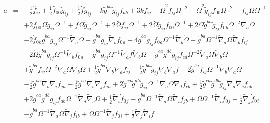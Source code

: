\documentclass[10pt,letterpaper]{article}
\numberwithin{equation}{section}
\begin{document}
\begin{eqnarray}
a&=& - \tfrac{1}{2} \overset{..}{f}_{ij} + \tfrac{1}{2} \overset{..}{f}_{00}{} \tilde{g}_{ij} + \tfrac{1}{2} \overset{..}{f} \tilde{g}_{ij} -  k \tilde{g}^{ba} \tilde{g}_{ij} f_{ab} + 3 k f_{ij} -  \dot{\Omega}^2 f_{ij} \Omega^{-2} -  \dot{\Omega}^2 \tilde{g}_{ij} f_{00}{} \Omega^{-2} -  \dot{f}_{ij} \dot{\Omega} \Omega^{-1} \nonumber \\ 
&& + 2 \dot{f}_{00}{} \dot{\Omega} \tilde{g}_{ij} \Omega^{-1} + \dot{f} \dot{\Omega} \tilde{g}_{ij} \Omega^{-1} + 2 \overset{..}{\Omega} f_{ij} \Omega^{-1} + 2 \overset{..}{\Omega} \tilde{g}_{ij} f_{00}{} \Omega^{-1} + 2 \dot{\Omega} \tilde{g}^{ba} \tilde{g}_{ij} f_{0}{}_{b} \Omega^{-2} \tilde{\nabla}_{a}\Omega \nonumber \\ 
&& - 2 \dot{f}_{0}{}_{b} \tilde{g}^{ba} \tilde{g}_{ij} \Omega^{-1} \tilde{\nabla}_{a}\Omega -  \tilde{g}^{ba} \tilde{g}_{ij} \tilde{\nabla}_{b}\dot{f}_{0}{}_{a} - 4 \tilde{g}^{ba} \tilde{g}_{ij} f_{0}{}_{a} \Omega^{-1} \tilde{\nabla}_{b}\dot{\Omega} + \tilde{g}^{ba} \Omega^{-1} \tilde{\nabla}_{a}\Omega \tilde{\nabla}_{b}f_{ij} \nonumber \\ 
&& - 2 \dot{\Omega} \tilde{g}^{ba} \tilde{g}_{ij} \Omega^{-1} \tilde{\nabla}_{b}f_{0}{}_{a} -  \tilde{g}^{ba} \tilde{g}_{ij} \Omega^{-1} \tilde{\nabla}_{a}f \tilde{\nabla}_{b}\Omega -  \tilde{g}^{ca} \tilde{g}^{db} \tilde{g}_{ij} f_{cd} \Omega^{-2} \tilde{\nabla}_{a}\Omega \tilde{\nabla}_{b}\Omega \nonumber \\ 
&& + \tilde{g}^{ba} f_{ij} \Omega^{-2} \tilde{\nabla}_{a}\Omega \tilde{\nabla}_{b}\Omega + \tfrac{1}{2} \tilde{g}^{ba} \tilde{\nabla}_{b}\tilde{\nabla}_{a}f_{ij} -  \tfrac{1}{2} \tilde{g}^{ba} \tilde{g}_{ij} \tilde{\nabla}_{b}\tilde{\nabla}_{a}f - 2 \tilde{g}^{ba} f_{ij} \Omega^{-1} \tilde{\nabla}_{b}\tilde{\nabla}_{a}\Omega \nonumber \\ 
&& -  \tfrac{1}{2} \tilde{g}^{ba} \tilde{\nabla}_{b}\tilde{\nabla}_{i}f_{ja} -  \tfrac{1}{2} \tilde{g}^{ba} \tilde{\nabla}_{b}\tilde{\nabla}_{j}f_{ia} + 2 \tilde{g}^{ca} \tilde{g}^{db} \tilde{g}_{ij} \Omega^{-1} \tilde{\nabla}_{a}\Omega \tilde{\nabla}_{d}f_{cb} + \tfrac{1}{2} \tilde{g}^{ca} \tilde{g}^{db} \tilde{g}_{ij} \tilde{\nabla}_{d}\tilde{\nabla}_{c}f_{ab} \nonumber \\ 
&& + 2 \tilde{g}^{ca} \tilde{g}^{db} \tilde{g}_{ij} f_{ab} \Omega^{-1} \tilde{\nabla}_{d}\tilde{\nabla}_{c}\Omega + \tfrac{1}{2} \tilde{\nabla}_{i}\dot{f}_{0}{}_{j} -  \tilde{g}^{ba} \Omega^{-1} \tilde{\nabla}_{a}\Omega \tilde{\nabla}_{i}f_{jb} + \dot{\Omega} \Omega^{-1} \tilde{\nabla}_{i}f_{0}{}_{j} + \tfrac{1}{2} \tilde{\nabla}_{j}\dot{f}_{0}{}_{i} \nonumber \\ 
&& -  \tilde{g}^{ba} \Omega^{-1} \tilde{\nabla}_{a}\Omega \tilde{\nabla}_{j}f_{ib} + \dot{\Omega} \Omega^{-1} \tilde{\nabla}_{j}f_{0}{}_{i} + \tfrac{1}{2} \tilde{\nabla}_{j}\tilde{\nabla}_{i}f
\end{eqnarray}
\end{document}
